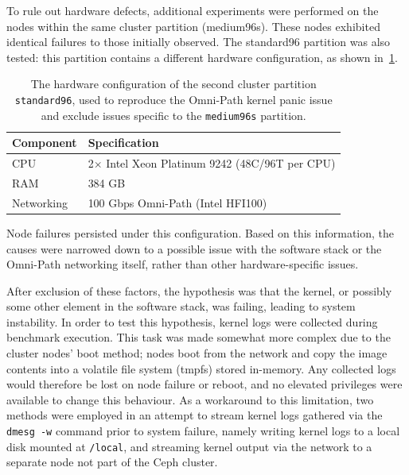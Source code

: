 To rule out hardware defects, additional experiments were performed on the nodes within the same cluster partition (medium96s). These nodes exhibited identical failures to those initially observed. The standard96 partition was also tested: this partition contains a different hardware configuration, as shown in~\cref{tbl:standard96-system}.

\begin{table}[H]
\centering
\begin{tabular}{|ll|}
\hline
\textbf{Component} & \textbf{Specification} \\
\hline
CPU        & 2$\times$ Intel Xeon Platinum 9242 (48C/96T per CPU) \\
RAM        & 384 GB \\
Networking & 100 Gbps Omni-Path (Intel HFI100) \\
\hline
\end{tabular}
\caption[Omni-Path Failure Test Hardware]{The hardware configuration of the second cluster partition \texttt{standard96}, used to reproduce the Omni-Path kernel panic issue and exclude issues specific to the \texttt{medium96s} partition.}
\label{tbl:standard96-system}
\end{table}

Node failures persisted under this configuration. Based on this information, the causes were narrowed down to a possible issue with the software stack or the Omni-Path networking itself, rather than other hardware-specific issues.

After exclusion of these factors, the hypothesis was that the kernel, or possibly some other element in the software stack, was failing, leading to
system instability. 
In order to test this hypothesis, kernel logs were collected during benchmark execution. 
This task was made somewhat more complex due to the cluster nodes' boot method; nodes boot from the network and copy the image contents into a volatile file system (tmpfs) stored in-memory. 
Any collected logs would therefore be lost on node failure or reboot, and no elevated privileges were available to change this behaviour. 
As a workaround to this limitation, two methods were employed in an attempt to stream kernel logs gathered via the \texttt{dmesg -w} command prior to system failure, namely writing kernel logs to a local disk mounted at \texttt{/local}, and streaming kernel output via the network to a separate node not part of the Ceph cluster.


